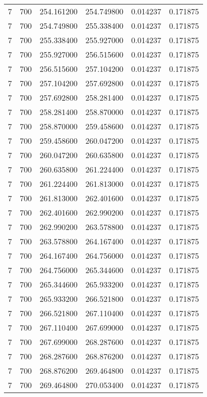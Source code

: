 \begin{longtable}{rrrrrr}
7 & 700 & 254.161200 & 254.749800 & 0.014237 & 0.171875 \\
7 & 700 & 254.749800 & 255.338400 & 0.014237 & 0.171875 \\
7 & 700 & 255.338400 & 255.927000 & 0.014237 & 0.171875 \\
7 & 700 & 255.927000 & 256.515600 & 0.014237 & 0.171875 \\
7 & 700 & 256.515600 & 257.104200 & 0.014237 & 0.171875 \\
7 & 700 & 257.104200 & 257.692800 & 0.014237 & 0.171875 \\
7 & 700 & 257.692800 & 258.281400 & 0.014237 & 0.171875 \\
7 & 700 & 258.281400 & 258.870000 & 0.014237 & 0.171875 \\
7 & 700 & 258.870000 & 259.458600 & 0.014237 & 0.171875 \\
7 & 700 & 259.458600 & 260.047200 & 0.014237 & 0.171875 \\
7 & 700 & 260.047200 & 260.635800 & 0.014237 & 0.171875 \\
7 & 700 & 260.635800 & 261.224400 & 0.014237 & 0.171875 \\
7 & 700 & 261.224400 & 261.813000 & 0.014237 & 0.171875 \\
7 & 700 & 261.813000 & 262.401600 & 0.014237 & 0.171875 \\
7 & 700 & 262.401600 & 262.990200 & 0.014237 & 0.171875 \\
7 & 700 & 262.990200 & 263.578800 & 0.014237 & 0.171875 \\
7 & 700 & 263.578800 & 264.167400 & 0.014237 & 0.171875 \\
7 & 700 & 264.167400 & 264.756000 & 0.014237 & 0.171875 \\
7 & 700 & 264.756000 & 265.344600 & 0.014237 & 0.171875 \\
7 & 700 & 265.344600 & 265.933200 & 0.014237 & 0.171875 \\
7 & 700 & 265.933200 & 266.521800 & 0.014237 & 0.171875 \\
7 & 700 & 266.521800 & 267.110400 & 0.014237 & 0.171875 \\
7 & 700 & 267.110400 & 267.699000 & 0.014237 & 0.171875 \\
7 & 700 & 267.699000 & 268.287600 & 0.014237 & 0.171875 \\
7 & 700 & 268.287600 & 268.876200 & 0.014237 & 0.171875 \\
7 & 700 & 268.876200 & 269.464800 & 0.014237 & 0.171875 \\
7 & 700 & 269.464800 & 270.053400 & 0.014237 & 0.171875 \\

\end{longtable}
